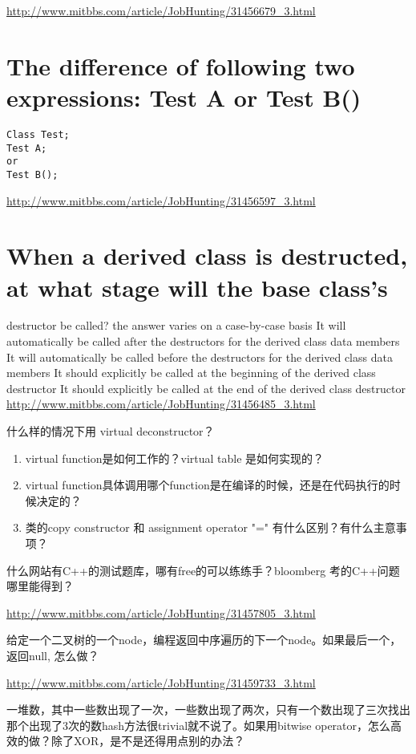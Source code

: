 \documentclass[12pt]{book}
\begin{document}
\url{http://www.mitbbs.com/article/JobHunting/31456679_3.html}

\section{The difference of following two expressions: Test A or Test B()}
\label{sec-14-4}
\lstset{language=java,label= ,caption= ,numbers=none}
\begin{lstlisting}
Class Test;
Test A;
or
Test B();
\end{lstlisting}

\url{http://www.mitbbs.com/article/JobHunting/31456597_3.html}

\section{When a derived class is destructed, at what stage will the base class's}
\label{sec-14-5}
destructor be called?
the answer varies on a case-by-case basis
It will automatically be called after the destructors for the derived class 
data members
It will automatically be called before the destructors for the derived class
data members
It should explicitly be called at the beginning of the derived class 
destructor
It should explicitly be called at the end of the derived class destructor
\url{http://www.mitbbs.com/article/JobHunting/31456485_3.html}

什么样的情况下用 virtual deconstructor？

\begin{enumerate}
\item virtual function是如何工作的？virtual table 是如何实现的？

\item virtual function具体调用哪个function是在编译的时候，还是在代码执行的时候决定的？

\item 类的copy constructor 和 assignment operator "=" 有什么区别？有什么主意事项？
\end{enumerate}

什么网站有C++的测试题库，哪有free的可以练练手？bloomberg 考的C++问题哪里能得到？

\url{http://www.mitbbs.com/article/JobHunting/31457805_3.html}

给定一个二叉树的一个node，编程返回中序遍历的下一个node。如果最后一个，返回null, 怎么做？

\url{http://www.mitbbs.com/article/JobHunting/31459733_3.html}

一堆数，其中一些数出现了一次，一些数出现了两次，只有一个数出现了三次找出那个出现了3次的数hash方法很trivial就不说了。如果用bitwise operator，怎么高效的做？除了XOR，是不是还得用点别的办法？
\end{document}
